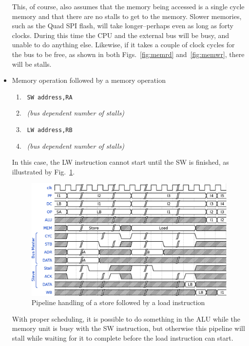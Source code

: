 \documentclass{gqtekspec}
\begin{document}
\begin{itemize}
This, of course, also assumes that the memory being accessed is a single cycle
memory and that there are no stalls to get to the memory.
Slower memories, such as the Quad SPI flash, will take longer--perhaps even
as long as forty clocks.   During this time the CPU and the external bus 
will be busy, and unable to do anything else.  Likewise, if it takes a couple
of clock cycles for the bus to be free, as shown in both Figs.~\ref{fig:memrd}
and~\ref{fig:memwr}, there will be stalls.

\item Memory operation followed by a memory operation
\begin{enumerate}
\item\ {\tt SW address,RA}
\item\ {\em (bus dependent number of stalls)}
\item\ {\tt LW address,RB}
\item\ {\em (bus dependent number of stalls)}
\end{enumerate}

	In this case, the LW instruction cannot start until the SW is finished,
	as illustrated by Fig.~\ref{fig:mstld}.
\begin{figure}\begin{center}
\includegraphics[width=5.5in]{../gfx/mstld.eps}
\caption{Pipeline handling of a store followed by a load instruction}\label{fig:mstld}
\end{center}\end{figure}
	With proper scheduling, it is possible to do something in the ALU
	while the memory unit is busy with the SW instruction, but otherwise
	this pipeline will stall while waiting for it to complete before the
	load instruction can start.


\end{itemize}
\end{document}
